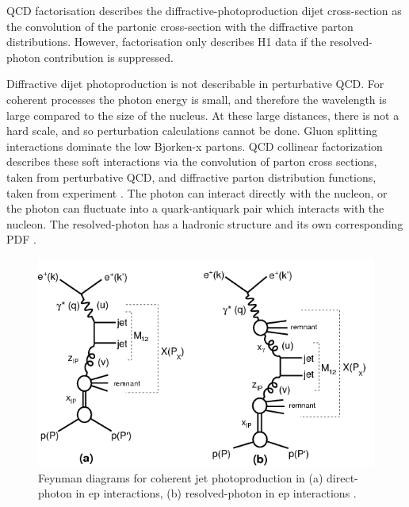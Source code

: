 QCD factorisation describes the diffractive-photoproduction dijet cross-section as the convolution of the partonic cross-section with the diffractive parton distributions. However, factorisation only describes H1 data if the resolved-photon contribution is suppressed. 

Diffractive dijet photoproduction is not describable in perturbative QCD. For coherent processes the photon energy is small, and therefore the wavelength is large compared to the size of the nucleus. At these large distances, there is not a hard scale, and so perturbation calculations cannot be done. Gluon splitting interactions dominate the low Bjorken-x partons. QCD collinear factorization describes these soft interactions via the convolution of parton cross sections, taken from perturbative QCD, and diffractive parton distribution functions, taken from experiment \cite{Andreev:2015cwa,Chekanov:2008fh}. The photon can interact directly with the nucleon, or the photon can fluctuate into a quark-antiquark pair which interacts with the nucleon. The resolved-photon has a hadronic structure and its own corresponding PDF \cite{Bauer:1977iq}.

\begin{figure}[]
\begin{centering}
\includegraphics[width=6in]{Chapter1/importfigs/h1_2015_feyn.png}
\par\end{centering}
\caption{Feynman diagrams for coherent jet photoproduction in (a) direct-photon in ep interactions, (b) resolved-photon in ep interactions \cite{Andreev:2015cwa}. \label{fig:feynmanUPC1}}
\end{figure}

